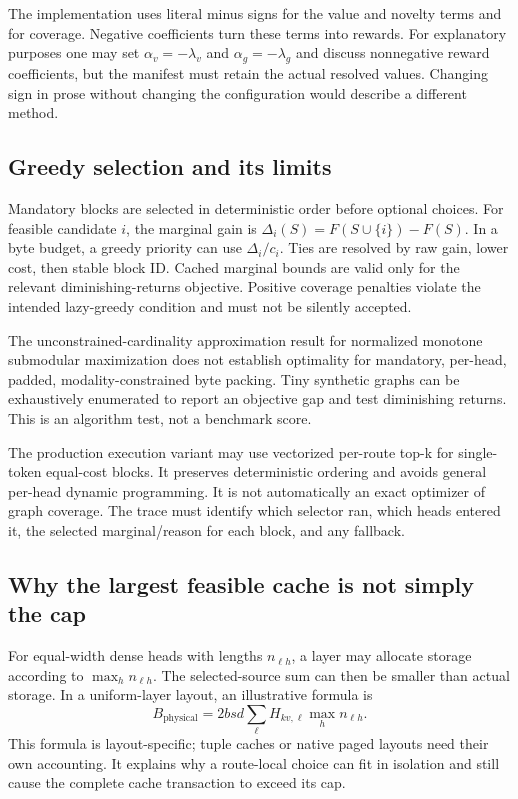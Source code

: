 The implementation uses literal minus signs for the value and novelty terms
and for coverage. Negative coefficients turn these terms into rewards.
For explanatory purposes one may set $\alpha_v=-\lambda_v$ and
$\alpha_g=-\lambda_g$ and discuss nonnegative reward coefficients, but the
manifest must retain the actual resolved values. Changing sign in prose
without changing the configuration would describe a different method.

\subsection{Greedy selection and its limits}
Mandatory blocks are selected in deterministic order before optional choices.
For feasible candidate $i$, the marginal gain is
$\Delta_i(S)=F(S\cup\{i\})-F(S)$. In a byte budget, a greedy priority can use
$\Delta_i/c_i$. Ties are resolved by raw gain, lower cost, then stable block ID.
Cached marginal bounds are valid only for the relevant diminishing-returns
objective. Positive coverage penalties violate the intended lazy-greedy
condition and must not be silently accepted.

The unconstrained-cardinality approximation result for normalized monotone
submodular maximization \citep{nemhauser1978} does not establish optimality for
mandatory, per-head, padded, modality-constrained byte packing. Tiny synthetic
graphs can be exhaustively enumerated to report an objective gap and test
diminishing returns. This is an algorithm test, not a benchmark score.

The production execution variant may use vectorized per-route top-k for
single-token equal-cost blocks. It preserves deterministic ordering and avoids
general per-head dynamic programming. It is not automatically an exact
optimizer of graph coverage. The trace must identify which selector ran, which
heads entered it, the selected marginal/reason for each block, and any fallback.

\subsection{Why the largest feasible cache is not simply the cap}
For equal-width dense heads with lengths $n_{\ell h}$, a layer may allocate
storage according to $\max_h n_{\ell h}$. The selected-source sum can then be
smaller than actual storage. In a uniform-layer layout, an illustrative formula
is
\begin{equation}
 B_{\mathrm{physical}}=2bsd\sum_{\ell}H_{kv,\ell}\max_h n_{\ell h}.
\end{equation}
This formula is layout-specific; tuple caches or native paged layouts need
their own accounting. It explains why a route-local choice can fit in isolation
and still cause the complete cache transaction to exceed its cap.

